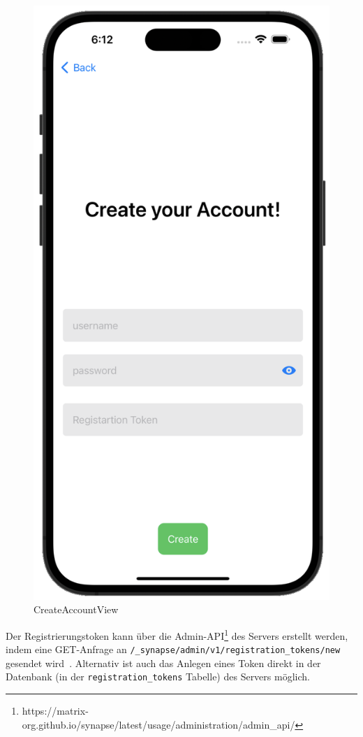     \begin{figure}[h]
        \includegraphics[scale=0.5]{accountcreate_white}
        \centering
        \caption{CreateAccountView}\label{fig:createaccountview}
    \end{figure}
    Der Registrierungstoken kann über die Admin-API\footnote{https://matrix-org.github.io/synapse/latest/usage/administration/admin\_api/} des Servers erstellt werden, indem eine GET-Anfrage an \texttt{/\_synapse/admin/v1/registration\_tokens/new} gesendet wird~\cite{synapseregistartiontoken}.
    Alternativ ist auch das Anlegen eines Token direkt in der Datenbank (in der \texttt{registration\_tokens} Tabelle) des Servers möglich.

